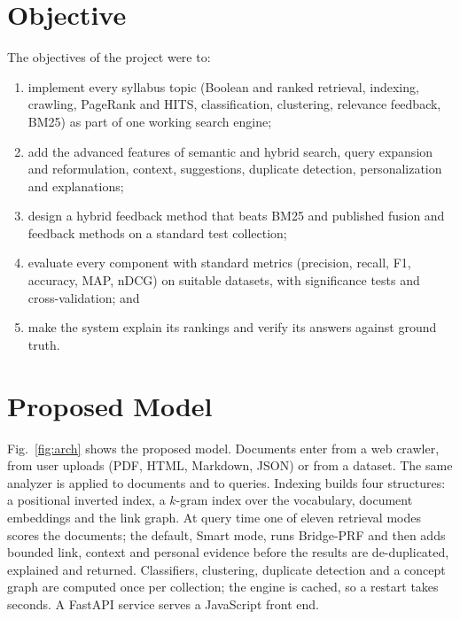 \documentclass[conference]{IEEEtran}
\begin{document}
\section{Objective}
The objectives of the project were to:
\begin{enumerate}
\item implement every syllabus topic (Boolean and ranked retrieval, indexing, crawling, PageRank and HITS, classification, clustering, relevance feedback, BM25) as part of one working search engine;
\item add the advanced features of semantic and hybrid search, query expansion and reformulation, context, suggestions, duplicate detection, personalization and explanations;
\item design a hybrid feedback method that beats BM25 and published fusion and feedback methods on a standard test collection;
\item evaluate every component with standard metrics (precision, recall, F1, accuracy, MAP, nDCG) on suitable datasets, with significance tests and cross-validation; and
\item make the system explain its rankings and verify its answers against ground truth.
\end{enumerate}

\section{Proposed Model}
Fig.~\ref{fig:arch} shows the proposed model. Documents enter from a web crawler, from user uploads (PDF, HTML, Markdown, JSON) or from a dataset. The same analyzer is applied to documents and to queries. Indexing builds four structures: a positional inverted index, a $k$-gram index over the vocabulary, document embeddings and the link graph. At query time one of eleven retrieval modes scores the documents; the default, Smart mode, runs Bridge-PRF and then adds bounded link, context and personal evidence before the results are de-duplicated, explained and returned. Classifiers, clustering, duplicate detection and a concept graph are computed once per collection; the engine is cached, so a restart takes seconds. A FastAPI service serves a JavaScript front end.
\end{document}
